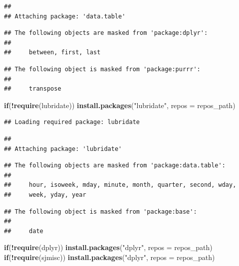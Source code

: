 \documentclass[]{article}
\newenvironment{Shaded}{\begin{snugshade}}{\end{snugshade}}
\newcommand{\ControlFlowTok}[1]{\textcolor[rgb]{0.13,0.29,0.53}{\textbf{#1}}}
\newcommand{\DataTypeTok}[1]{\textcolor[rgb]{0.13,0.29,0.53}{#1}}
\newcommand{\KeywordTok}[1]{\textcolor[rgb]{0.13,0.29,0.53}{\textbf{#1}}}
\newcommand{\NormalTok}[1]{#1}
\newcommand{\OperatorTok}[1]{\textcolor[rgb]{0.81,0.36,0.00}{\textbf{#1}}}
\newcommand{\StringTok}[1]{\textcolor[rgb]{0.31,0.60,0.02}{#1}}
\begin{document}
\begin{verbatim}
## 
## Attaching package: 'data.table'
\end{verbatim}

\begin{verbatim}
## The following objects are masked from 'package:dplyr':
## 
##     between, first, last
\end{verbatim}

\begin{verbatim}
## The following object is masked from 'package:purrr':
## 
##     transpose
\end{verbatim}

\begin{Shaded}
\begin{Highlighting}[]
\ControlFlowTok{if}\NormalTok{(}\OperatorTok{!}\KeywordTok{require}\NormalTok{(lubridate)) }\KeywordTok{install.packages}\NormalTok{(}\StringTok{"lubridate"}\NormalTok{, }\DataTypeTok{repos =}\NormalTok{ repos_path)}
\end{Highlighting}
\end{Shaded}

\begin{verbatim}
## Loading required package: lubridate
\end{verbatim}

\begin{verbatim}
## 
## Attaching package: 'lubridate'
\end{verbatim}

\begin{verbatim}
## The following objects are masked from 'package:data.table':
## 
##     hour, isoweek, mday, minute, month, quarter, second, wday,
##     week, yday, year
\end{verbatim}

\begin{verbatim}
## The following object is masked from 'package:base':
## 
##     date
\end{verbatim}

\begin{Shaded}
\begin{Highlighting}[]
\ControlFlowTok{if}\NormalTok{(}\OperatorTok{!}\KeywordTok{require}\NormalTok{(dplyr)) }\KeywordTok{install.packages}\NormalTok{(}\StringTok{"dplyr"}\NormalTok{, }\DataTypeTok{repos =}\NormalTok{ repos_path)}
\ControlFlowTok{if}\NormalTok{(}\OperatorTok{!}\KeywordTok{require}\NormalTok{(sjmisc)) }\KeywordTok{install.packages}\NormalTok{(}\StringTok{"dplyr"}\NormalTok{, }\DataTypeTok{repos =}\NormalTok{ repos_path)}
\end{Highlighting}
\end{Shaded}
\end{document}
